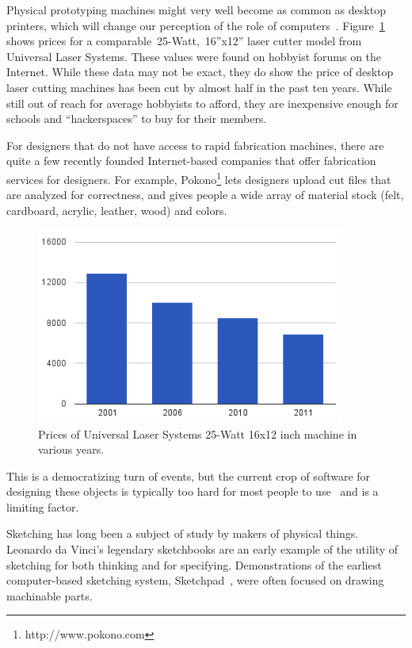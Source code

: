 \documentclass[12pt]{article}
\begin{document}

Physical prototyping machines might very well become as common as
desktop printers, which will change our perception of the role of
computers~\cite{eisenberg-homespun}. Figure~\ref{fig:prices} shows
prices for a comparable~25-Watt,~16''x12'' laser cutter model from
Universal Laser Systems. These values were found on hobbyist forums on
the Internet. While these data may not be exact, they do show the
price of desktop laser cutting machines has been cut by almost half in
the past ten years. While still out of reach for average hobbyists to
afford, they are inexpensive enough for schools and ``hackerspaces''
to buy for their members.

For designers that do not have access to rapid fabrication machines,
there are quite a few recently founded Internet-based companies that
offer fabrication services for designers. For example,
Pokono\footnote{http://www.pokono.com} lets designers upload cut files
that are analyzed for correctness, and gives people a wide array of
material stock (felt, cardboard, acrylic, leather, wood) and colors.

\begin{figure}[h] %
   \centering
   \includegraphics[width=4in]{img/prices.png} 
   \caption{Prices of Universal Laser Systems 25-Watt 16x12 inch
     machine in various years.}
   \label{fig:prices}
\end{figure}

This is a democratizing turn of events, but the current crop of
software for designing these objects is typically too hard for most
people to use~\cite{landay-design-tools} and is a limiting factor.

Sketching has long been a subject of study by makers of physical
things. Leonardo da Vinci's legendary sketchbooks are an early example
of the utility of sketching for both thinking and for
specifying. Demonstrations of the earliest computer-based sketching
system, Sketchpad~\cite{sutherland-sketchpad}, were often focused on
drawing machinable parts.
\end{document}
